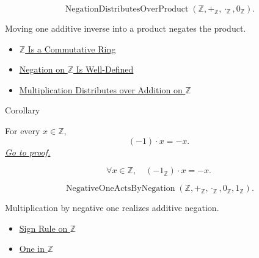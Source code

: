 \begin{remark*}
\[
\operatorname{NegationDistributesOverProduct}(\mathbb{Z},+_{\mathbb{Z}},\cdot_{\mathbb{Z}},0_{\mathbb{Z}}).
\]
\end{remark*}

\begin{remark*}[Interpretation]
Moving one additive inverse into a product negates the product.
\end{remark*}

\begin{dependencies}
\begin{itemize}
  \item \hyperref[thm:z-commutative-ring]{$\mathbb{Z}$ Is a Commutative
 Ring}
  \item \hyperref[thm:negation-on-z-well-defined]{Negation on $\mathbb{Z}$ Is Well-Defined}
  \item \hyperref[thm:multiplication-distributes-over-addition-on-z]{Multiplication Distributes over Addition on $\mathbb{Z}$}
\end{itemize}
\end{dependencies}

\begin{corollarybox}{Corollary}
\begin{corollary}
\label{cor:negative-one-rule-on-z}
For every $x\in\mathbb{Z}$,
\[
(-1)\cdot x=-x.
\]
\hyperref[prf:negative-one-rule-on-z]{\textit{Go to proof.}}
\end{corollary}
\end{corollarybox}

\begin{remark*}
\[
\forall x\in\mathbb{Z},\quad (-1_{\mathbb{Z}})\cdot x=-x.
\]
\end{remark*}

\begin{remark*}
\[
\operatorname{NegativeOneActsByNegation}(\mathbb{Z},+_{\mathbb{Z}},\cdot_{\mathbb{Z}},0_{\mathbb{Z}},1_{\mathbb{Z}}).
\]
\end{remark*}

\begin{remark*}[Interpretation]
Multiplication by negative one realizes additive negation.
\end{remark*}

\begin{dependencies}
\begin{itemize}
  \item \hyperref[cor:sign-rule-on-z]{Sign Rule on $\mathbb{Z}$}
  \item \hyperref[def:one-in-z]{One in $\mathbb{Z}$}
\end{itemize}
\end{dependencies}

